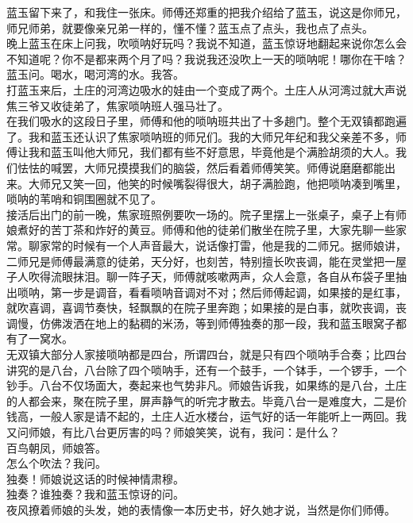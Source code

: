 蓝玉留下来了，和我住一张床。师傅还郑重的把我介绍给了蓝玉，说这是你师兄，师兄师弟，就要像亲兄弟一样的，懂不懂？蓝玉点了点头，我也点了点头。
\\

晚上蓝玉在床上问我，吹唢呐好玩吗？我说不知道，蓝玉惊讶地翻起来说你怎么会不知道呢？你不是都来两个月了吗？我说我还没吹上一天的唢呐呢！哪你在干啥？蓝玉问。喝水，喝河湾的水。我答。
\\

打蓝玉来后，土庄的河湾边吸水的娃由一个变成了两个。土庄人从河湾过就大声说焦三爷又收徒弟了，焦家唢呐班人强马壮了。
\\

在我们吸水的这段日子里，师傅和他的唢呐班共出了十多趟门。整个无双镇都跑遍了。我和蓝玉还认识了焦家唢呐班的师兄们。我的大师兄年纪和我父亲差不多，师傅让我和蓝玉叫他大师兄，我们都有些不好意思，毕竟他是个满脸胡须的大人。我们怯怯的喊罢，大师兄摸摸我们的脑袋，然后看着师傅笑笑。师傅说磨磨都能出来。大师兄又笑一回，他笑的时候嘴裂得很大，胡子满脸跑，他把唢呐凑到嘴里，唢呐的苇哨和铜围圈就不见了。
\\

接活后出门的前一晚，焦家班照例要吹一场的。院子里摆上一张桌子，桌子上有师娘煮好的苦丁茶和炸好的黄豆。师傅和他的徒弟们散坐在院子里，大家先聊一些家常。聊家常的时候有一个人声音最大，说话像打雷，他是我的二师兄。据师娘讲，二师兄是师傅最满意的徒弟，天分好，也刻苦，特别擅长吹丧调，能在灵堂把一屋子人吹得流眼抹泪。聊一阵子天，师傅就咳嗽两声，众人会意，各自从布袋子里抽出唢呐，第一步是调音，看看唢呐音调对不对；然后师傅起调，如果接的是红事，就吹喜调，喜调节奏快，轻飘飘的在院子里奔跑；如果接的是白事，就吹丧调，丧调慢，仿佛泼洒在地上的黏稠的米汤，等到师傅独奏的那一段，我和蓝玉眼窝子都有了一窝水。
\\

无双镇大部分人家接唢呐都是四台，所谓四台，就是只有四个唢呐手合奏；比四台讲究的是八台，八台除了四个唢呐手，还有一个鼓手，一个钵手，一个锣手，一个钞手。八台不仅场面大，奏起来也气势非凡。师娘告诉我，如果练的是八台，土庄的人都会来，聚在院子里，屏声静气的听完才散去。毕竟八台一是难度大，二是价钱高，一般人家是请不起的，土庄人近水楼台，运气好的话一年能听上一两回。我又问师娘，有比八台更厉害的吗？师娘笑笑，说有，我问：是什么？
\\

百鸟朝凤，师娘答。
\\

怎么个吹法？我问。
\\

独奏！师娘说这话的时候神情肃穆。
\\

独奏？谁独奏？我和蓝玉惊讶的问。
\\

夜风撩着师娘的头发，她的表情像一本历史书，好久她才说，当然是你们师傅。\\